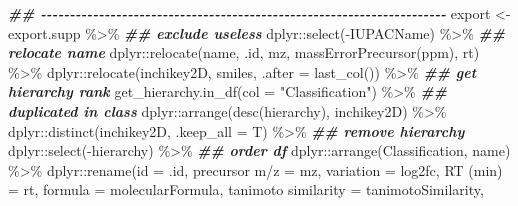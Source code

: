 \documentclass[
]{article}
\newenvironment{Shaded}{\begin{snugshade}}{\end{snugshade}}
\newcommand{\AttributeTok}[1]{\textcolor[rgb]{0.77,0.63,0.00}{#1}}
\newcommand{\DocumentationTok}[1]{\textcolor[rgb]{0.56,0.35,0.01}{\textbf{\textit{#1}}}}
\newcommand{\FunctionTok}[1]{\textcolor[rgb]{0.00,0.00,0.00}{#1}}
\newcommand{\NormalTok}[1]{#1}
\newcommand{\OtherTok}[1]{\textcolor[rgb]{0.56,0.35,0.01}{#1}}
\newcommand{\SpecialCharTok}[1]{\textcolor[rgb]{0.00,0.00,0.00}{#1}}
\newcommand{\StringTok}[1]{\textcolor[rgb]{0.31,0.60,0.02}{#1}}
\begin{document}
\begin{Shaded}
\begin{Highlighting}[]
\DocumentationTok{\#\# {-}{-}{-}{-}{-}{-}{-}{-}{-}{-}{-}{-}{-}{-}{-}{-}{-}{-}{-}{-}{-}{-}{-}{-}{-}{-}{-}{-}{-}{-}{-}{-}{-}{-}{-}{-}{-}{-}{-}{-}{-}{-}{-}{-}{-}{-}{-}{-}{-}{-}{-}{-}{-}{-}{-}{-}{-}{-}{-}{-}{-}{-}{-}{-}{-}{-}{-}{-}{-}{-} }
\NormalTok{export }\OtherTok{\textless{}{-}}\NormalTok{ export.supp }\SpecialCharTok{\%\textgreater{}\%} 
  \DocumentationTok{\#\# exclude useless}
\NormalTok{  dplyr}\SpecialCharTok{::}\FunctionTok{select}\NormalTok{(}\SpecialCharTok{{-}}\NormalTok{IUPACName) }\SpecialCharTok{\%\textgreater{}\%} 
  \DocumentationTok{\#\# relocate name}
\NormalTok{  dplyr}\SpecialCharTok{::}\FunctionTok{relocate}\NormalTok{(name, .id, mz, }\StringTok{\textasciigrave{}}\AttributeTok{massErrorPrecursor(ppm)}\StringTok{\textasciigrave{}}\NormalTok{, rt) }\SpecialCharTok{\%\textgreater{}\%} 
\NormalTok{  dplyr}\SpecialCharTok{::}\FunctionTok{relocate}\NormalTok{(inchikey2D, smiles, }\AttributeTok{.after =} \FunctionTok{last\_col}\NormalTok{()) }\SpecialCharTok{\%\textgreater{}\%} 
  \DocumentationTok{\#\# get hierarchy rank}
  \FunctionTok{get\_hierarchy.in\_df}\NormalTok{(}\AttributeTok{col =} \StringTok{"Classification"}\NormalTok{) }\SpecialCharTok{\%\textgreater{}\%} 
  \DocumentationTok{\#\# duplicated in class}
\NormalTok{  dplyr}\SpecialCharTok{::}\FunctionTok{arrange}\NormalTok{(}\FunctionTok{desc}\NormalTok{(hierarchy), inchikey2D) }\SpecialCharTok{\%\textgreater{}\%} 
\NormalTok{  dplyr}\SpecialCharTok{::}\FunctionTok{distinct}\NormalTok{(inchikey2D, }\AttributeTok{.keep\_all =}\NormalTok{ T) }\SpecialCharTok{\%\textgreater{}\%} 
  \DocumentationTok{\#\# remove hierarchy}
\NormalTok{  dplyr}\SpecialCharTok{::}\FunctionTok{select}\NormalTok{(}\SpecialCharTok{{-}}\NormalTok{hierarchy) }\SpecialCharTok{\%\textgreater{}\%} 
  \DocumentationTok{\#\# order df}
\NormalTok{  dplyr}\SpecialCharTok{::}\FunctionTok{arrange}\NormalTok{(Classification, name) }\SpecialCharTok{\%\textgreater{}\%} 
\NormalTok{  dplyr}\SpecialCharTok{::}\FunctionTok{rename}\NormalTok{(}\AttributeTok{id =}\NormalTok{ .id, }\StringTok{\textasciigrave{}}\AttributeTok{precursor m/z}\StringTok{\textasciigrave{}} \OtherTok{=}\NormalTok{ mz,}
                \AttributeTok{variation =}\NormalTok{ log2fc,}
                \StringTok{\textasciigrave{}}\AttributeTok{RT (min)}\StringTok{\textasciigrave{}} \OtherTok{=}\NormalTok{ rt, }\AttributeTok{formula =}\NormalTok{ molecularFormula,}
                \StringTok{\textasciigrave{}}\AttributeTok{tanimoto similarity}\StringTok{\textasciigrave{}} \OtherTok{=}\NormalTok{ tanimotoSimilarity,}

\end{Highlighting}
\end{Shaded}
\end{document}
